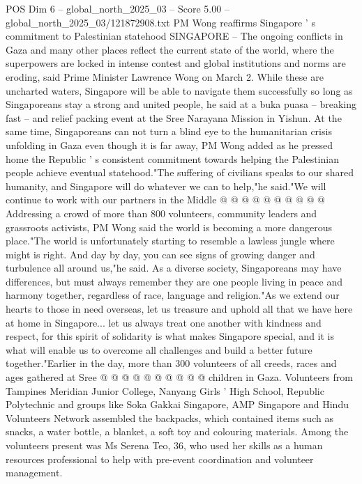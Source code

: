 \begin{textsample}{POS Dim 6 – global\_north\_2025\_03 – Score 5.00 – global\_north\_2025\_03/121872908.txt}  \label{ex:f6_pos_227}
PM Wong reaffirms Singapore ' s commitment to Palestinian statehood SINGAPORE -- The ongoing conflicts in Gaza and many other places reflect the current state of the world, where the superpowers are locked in intense contest and global institutions and norms are eroding, said Prime Minister Lawrence Wong on March 2.
While these are uncharted waters, Singapore will be able to navigate them successfully so long as Singaporeans stay a strong and united people, he said at a buka puasa -- breaking fast -- and relief packing event at the Sree Narayana Mission in Yishun.
At the same time, Singaporeans can not turn a blind eye to the humanitarian crisis unfolding in Gaza even though it is far away, PM Wong added as he pressed home the Republic ' s consistent commitment towards helping the Palestinian people achieve eventual statehood."The suffering of civilians speaks to our shared humanity, and Singapore will do whatever we can to help,"he said."We will continue to work with our partners in the Middle @ @ @ @ @ @ @ @ @ @ Addressing a crowd of more than 800 volunteers, community leaders and grassroots activists, PM Wong said the world is becoming a more dangerous place."The world is unfortunately starting to resemble a lawless jungle where might is right.
And day by day, you can see signs of growing danger and turbulence all around us,"he said.
As a diverse society, Singaporeans may have differences, but must always remember they are one people living in peace and harmony together, regardless of race, language and religion."As we extend our hearts to those in need overseas, let us treasure and uphold all that we have here at home in Singapore... let us always treat one another with kindness and respect, for this spirit of solidarity is what makes Singapore special, and it is what will enable us to overcome all challenges and build a better future together."Earlier in the day, more than 300 volunteers of all creeds, races and ages gathered at Sree @ @ @ @ @ @ @ @ @ @ children in Gaza.
Volunteers from Tampines Meridian Junior College, Nanyang Girls ' High School, Republic Polytechnic and groups like Soka Gakkai Singapore, AMP Singapore and Hindu Volunteers Network assembled the backpacks, which contained items such as snacks, a water bottle, a blanket, a soft toy and colouring materials.
Among the volunteers present was Ms Serena Teo, 36, who used her skills as a human resources professional to help with pre-event coordination and volunteer management.

\end{textsample}

